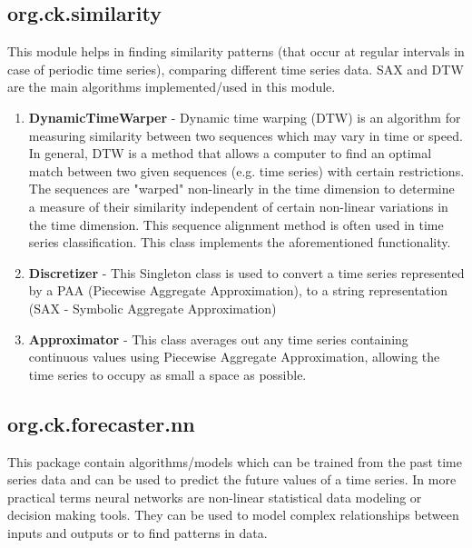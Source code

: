 \documentclass[12pt]{report}
\begin{document}
\subsection{org.ck.similarity}
This module helps in finding similarity patterns (that occur at regular intervals in case of periodic time series), comparing different time series data. SAX and DTW are the main algorithms implemented/used in this module.

\begin{enumerate}
\item{\textbf{DynamicTimeWarper} - Dynamic time warping (DTW) is an algorithm for measuring similarity between two sequences which may vary in time or speed. In general, DTW is a method that allows a computer to find an optimal match between two given sequences (e.g. time series) with certain restrictions. The sequences are "warped" non-linearly in the time dimension to determine a measure of their similarity independent of certain non-linear variations in the time dimension. This sequence alignment method is often used in time series classification. This class implements the aforementioned functionality.}

\item{\textbf{Discretizer} - This Singleton class is used to convert a time series represented by a PAA (Piecewise Aggregate Approximation), to a string representation (SAX - Symbolic Aggregate Approximation)}

\item{\textbf{Approximator} - This class averages out any time series containing continuous values using Piecewise Aggregate Approximation, allowing the time series to occupy as small a space as possible.}

\end{enumerate}


\subsection{org.ck.forecaster.nn}

This package contain algorithms/models which can be trained from the past time series data and can be used to predict the future values of a time series. In more practical terms neural networks are non-linear statistical data modeling or decision making tools. They can be used to model complex relationships between inputs and outputs or to find patterns in data.
\end{document}
